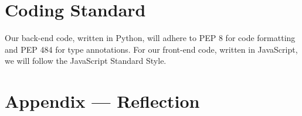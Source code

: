 \documentclass{article}
\begin{document}

\section{Coding Standard}
Our back-end code, written in Python, will adhere to PEP 8 for code formatting and PEP 484 for type annotations. 
For our front-end code, written in JavaScript, we will follow the JavaScript Standard Style.

\newpage{}

\section*{Appendix --- Reflection}


% 
\end{document}
